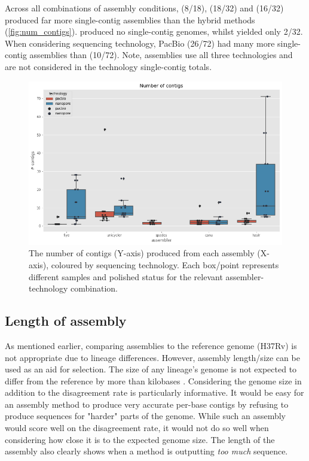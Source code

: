 Across all combinations of assembly conditions,  (8/18),  (18/32) and  (16/32) produced far more single-contig assemblies than the hybrid methods (\autoref{fig:num_contigs}).  produced no single-contig genomes, whilst  yielded only 2/32. When considering sequencing technology, PacBio (26/72) had many more single-contig assemblies than \ont{} (10/72). Note,  assemblies use all three technologies and are not considered in the technology single-contig totals.

\begin{figure}
\includegraphics[width=1.0\textwidth]{Appendix1/Figs/num_contigs.png}
\centering
\caption{The number of contigs (Y-axis) produced from each assembly (X-axis), coloured by sequencing technology. Each box/point represents different samples and polished status for the relevant assembler-technology combination.}
\label{fig:num_contigs}
\end{figure}

\subsection{Length of assembly}

As mentioned earlier, comparing assemblies to the \mtb{} reference genome (H37Rv) is not appropriate due to lineage differences. However, assembly length/size can be used as an aid for selection. The size of any lineage's genome is not expected to differ from the reference by more than  kilobases \cite{kato2001}. Considering the genome size in addition to the disagreement rate is particularly informative. It would be easy for an assembly method to produce very accurate per-base contigs by refusing to produce sequences for "harder" parts of the genome. While such an assembly would score well on the disagreement rate, it would not do so well when considering how close it is to the expected genome size. The length of the assembly also clearly shows when a method is outputting \emph{too much} sequence.

